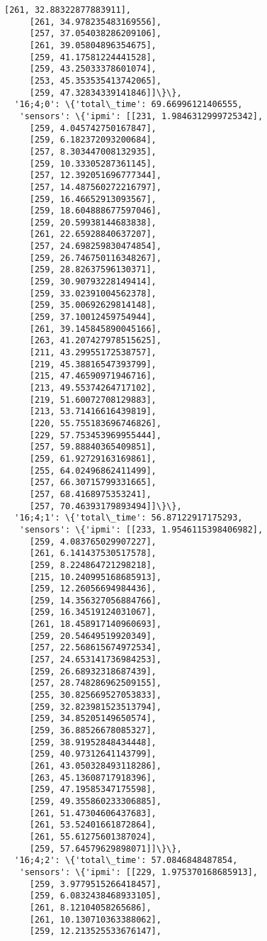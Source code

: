 \documentclass[11pt]{article}
\begin{document}
\begin{tcolorbox}[breakable, size=fbox, boxrule=.5pt, pad at break*=1mm, opacityfill=0]
\begin{Verbatim}[commandchars=\\\{\}]
     [261, 32.88322877883911],
     [261, 34.978235483169556],
     [257, 37.054038286209106],
     [261, 39.05804896354675],
     [259, 41.17581224441528],
     [259, 43.25033378601074],
     [253, 45.353535413742065],
     [259, 47.32834339141846]]\}\},
  '16;4;0': \{'total\_time': 69.66996121406555,
   'sensors': \{'ipmi': [[231, 1.9846312999725342],
     [259, 4.045742750167847],
     [259, 6.182372093200684],
     [257, 8.303447008132935],
     [259, 10.33305287361145],
     [257, 12.392051696777344],
     [257, 14.487560272216797],
     [259, 16.46652913093567],
     [259, 18.604888677597046],
     [259, 20.59938144683838],
     [261, 22.65928840637207],
     [257, 24.698259830474854],
     [259, 26.746750116348267],
     [259, 28.82637596130371],
     [259, 30.90793228149414],
     [259, 33.02391004562378],
     [259, 35.00692629814148],
     [259, 37.10012459754944],
     [261, 39.145845890045166],
     [263, 41.207427978515625],
     [211, 43.29955172538757],
     [219, 45.38816547393799],
     [215, 47.46590971946716],
     [213, 49.55374264717102],
     [219, 51.60072708129883],
     [213, 53.71416616439819],
     [220, 55.755183696746826],
     [229, 57.753453969955444],
     [257, 59.88840365409851],
     [259, 61.92729163169861],
     [255, 64.02496862411499],
     [257, 66.30715799331665],
     [257, 68.4168975353241],
     [257, 70.46393179893494]]\}\},
  '16;4;1': \{'total\_time': 56.87122917175293,
   'sensors': \{'ipmi': [[233, 1.9546115398406982],
     [259, 4.083765029907227],
     [261, 6.141437530517578],
     [259, 8.224864721298218],
     [215, 10.240995168685913],
     [259, 12.26056694984436],
     [259, 14.356327056884766],
     [259, 16.34519124031067],
     [261, 18.458917140960693],
     [259, 20.54649519920349],
     [257, 22.568615674972534],
     [257, 24.653141736984253],
     [259, 26.68932318687439],
     [257, 28.748286962509155],
     [255, 30.825669527053833],
     [259, 32.823981523513794],
     [259, 34.85205149650574],
     [259, 36.88526678085327],
     [259, 38.91952848434448],
     [259, 40.97312641143799],
     [261, 43.050328493118286],
     [263, 45.13608717918396],
     [259, 47.19585347175598],
     [259, 49.355860233306885],
     [261, 51.47304606437683],
     [261, 53.52401661872864],
     [261, 55.61275601387024],
     [259, 57.64579629898071]]\}\},
  '16;4;2': \{'total\_time': 57.0846848487854,
   'sensors': \{'ipmi': [[229, 1.975370168685913],
     [259, 3.9779515266418457],
     [259, 6.0832438468933105],
     [261, 8.12104058265686],
     [261, 10.130710363388062],
     [259, 12.213525533676147],

\end{Verbatim}
\end{tcolorbox}
\end{document}
